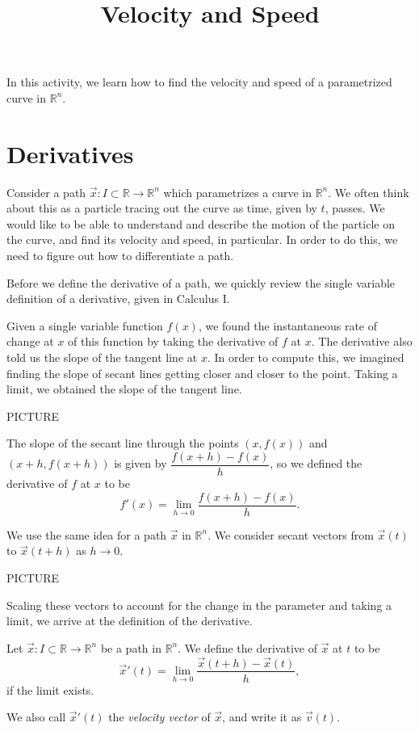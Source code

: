 \documentclass{ximera}
\title{Velocity and Speed}
\begin{document}
\begin{abstract}
\end{abstract}
\maketitle

In this activity, we learn how to find the velocity and speed of a parametrized curve in $\mathbb{R}^n$.

\section*{Derivatives}

Consider a path $\vec{x}:I\subset\mathbb{R}\rightarrow\mathbb{R}^n$ which parametrizes a curve in $\mathbb{R}^n$. We often think about this as a particle tracing out the curve as time, given by $t$, passes. We would like to be able to understand and describe the motion of the particle on the curve, and find its velocity and speed, in particular. In order to do this, we need to figure out how to differentiate a path.

Before we define the derivative of a path, we quickly review the single variable definition of a derivative, given in Calculus I.

Given a single variable function $f(x)$, we found the instantaneous rate of change at $x$ of this function by taking the derivative of $f$ at $x$. The derivative also told us the slope of the tangent line at $x$. In order to compute this, we imagined finding the slope of secant lines getting closer and closer to the point. Taking a limit, we obtained the slope of the tangent line.

PICTURE

The slope of the secant line through the points $(x,f(x))$ and $(x+h,f(x+h))$ is given by $\dfrac{f(x+h)-f(x)}{h}$, so we defined the derivative of $f$ at $x$ to be
\[
f'(x) = \lim_{h\rightarrow 0}\frac{f(x+h)-f(x)}{h}.
\]

We use the same idea for a path $\vec{x}$ in $\mathbb{R}^n$. We consider secant vectors from $\vec{x}(t)$ to $\vec{x}(t+h)$ as $h\rightarrow 0$.

PICTURE

Scaling these vectors to account for the change in the parameter and taking a limit, we arrive at the definition of the derivative.

\begin{definition}
Let $\vec{x}:I\subset\mathbb{R}\rightarrow\mathbb{R}^n$ be a path in $\mathbb{R}^n$. We define the derivative of $\vec{x}$ at $t$ to be
\[
\vec{x}'(t) = \lim_{h\rightarrow 0} \frac{\vec{x}(t+h) - \vec{x}(t)}{h},
\]
if the limit exists.

We also call $\vec{x}'(t)$ the \emph{velocity vector} of $\vec{x}$, and write it as $\vec{v}(t)$.
\end{definition}
\end{document}

